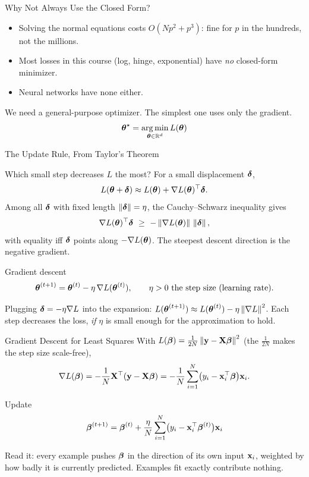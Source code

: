 \documentclass[11pt,aspectratio=169]{beamer}
\begin{document}

\begin{frame}{Why Not Always Use the Closed Form?}
\begin{itemize}
  \item Solving the normal equations costs $O(Np^2+p^3)$: fine for $p$ in the hundreds, not the millions.
  \item Most losses in this course (log, hinge, exponential) have \emph{no} closed-form minimizer.
  \item Neural networks have none either.
\end{itemize}
\vspace{6pt}
We need a general-purpose optimizer. The simplest one uses only the gradient.
\[
\boldsymbol{\theta}^\star=\operatorname*{arg\,min}_{\boldsymbol{\theta}\in\mathbb{R}^d}L(\boldsymbol{\theta})
\]
\end{frame}

\begin{frame}{The Update Rule, From Taylor's Theorem}\small
\begin{derivation}{Which small step decreases $L$ the most?}
For a small displacement $\boldsymbol{\delta}$,
\[
L(\boldsymbol{\theta}+\boldsymbol{\delta})\approx L(\boldsymbol{\theta})+\nabla L(\boldsymbol{\theta})^{\top}\boldsymbol{\delta} .
\]
Among all $\boldsymbol{\delta}$ with fixed length $\left\lVert \boldsymbol{\delta} \right\rVert=\eta$, the Cauchy--Schwarz inequality gives
\[
\nabla L(\boldsymbol{\theta})^{\top}\boldsymbol{\delta}\ \ge\ -\left\lVert \nabla L(\boldsymbol{\theta}) \right\rVert\,\left\lVert \boldsymbol{\delta} \right\rVert,
\]
with equality iff $\boldsymbol{\delta}$ points along $-\nabla L(\boldsymbol{\theta})$. The steepest descent direction is the
negative gradient.
\end{derivation}
\begin{block}{Gradient descent}
\[
\boldsymbol{\theta}^{(t+1)}=\boldsymbol{\theta}^{(t)}-\eta\,\nabla L(\boldsymbol{\theta}^{(t)}),\qquad \eta>0 \text{ the step size (learning rate)}.
\]
\end{block}
Plugging $\boldsymbol{\delta}=-\eta\nabla L$ into the expansion: $L(\boldsymbol{\theta}^{(t+1)})\approx L(\boldsymbol{\theta}^{(t)})-\eta\left\lVert \nabla L \right\rVert^2$.
Each step decreases the loss, \emph{if} $\eta$ is small enough for the approximation to hold.
\end{frame}

\begin{frame}{Gradient Descent for Least Squares}
With $L(\boldsymbol{\beta})=\tfrac{1}{2N}\left\lVert \mathbf{y}-\mathbf{X}\boldsymbol{\beta} \right\rVert^2$ (the $\tfrac1{2N}$ makes the step size scale-free),
\[
\nabla L(\boldsymbol{\beta})=-\frac1N\mathbf{X}^{\top}(\mathbf{y}-\mathbf{X}\boldsymbol{\beta})=-\frac1N\sum_{i=1}^N\bigl(y_i-\mathbf{x}_i^{\top}\boldsymbol{\beta}\bigr)\mathbf{x}_i .
\]
\begin{block}{Update}
\[
\boldsymbol{\beta}^{(t+1)}=\boldsymbol{\beta}^{(t)}+\frac{\eta}{N}\sum_{i=1}^N\bigl(y_i-\mathbf{x}_i^{\top}\boldsymbol{\beta}^{(t)}\bigr)\mathbf{x}_i
\]
\end{block}
Read it: every example pushes $\boldsymbol{\beta}$ in the direction of its own input $\mathbf{x}_i$, weighted by how badly
it is currently predicted. Examples fit exactly contribute nothing.
\end{frame}
\end{document}

